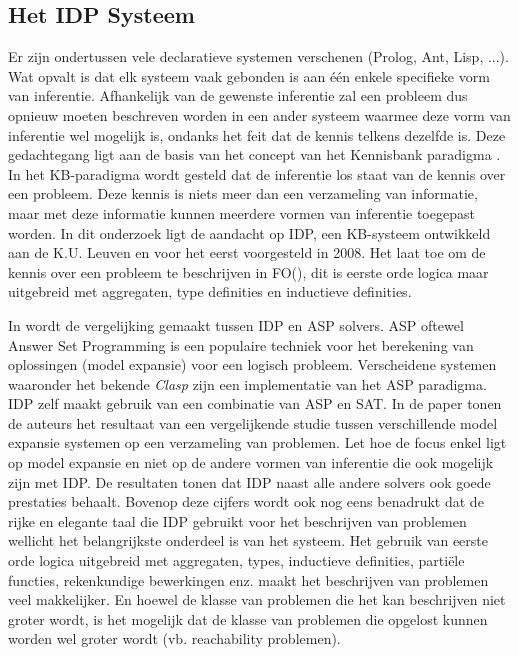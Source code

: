 \subsection{Het IDP Systeem}
Er zijn ondertussen vele declaratieve systemen verschenen (Prolog, Ant, Lisp, ...). Wat opvalt is dat elk systeem vaak gebonden is aan \'{e}\'{e}n enkele specifieke vorm van inferentie. Afhankelijk van de gewenste inferentie zal een probleem dus opnieuw moeten beschreven worden in een ander systeem waarmee deze vorm van inferentie wel mogelijk is, ondanks het feit dat de kennis telkens dezelfde is. Deze gedachtegang ligt aan de basis van het concept van het Kennisbank paradigma \citep{denecker2008building}. In het KB-paradigma wordt gesteld dat de inferentie los staat van de kennis over een probleem. Deze kennis is niets meer dan een verzameling van informatie, maar met deze informatie kunnen meerdere vormen van inferentie toegepast worden. In dit onderzoek ligt de aandacht op IDP, een KB-systeem ontwikkeld aan de K.U. Leuven en voor het eerst voorgesteld in 2008. Het laat toe om de kennis over een probleem te beschrijven in FO(\textperiodcentered), dit is eerste orde logica maar uitgebreid met aggregaten, type definities en inductieve definities. 

In \citep{wittocx2008idp} wordt de vergelijking gemaakt tussen IDP en ASP solvers. ASP oftewel Answer Set Programming is een populaire techniek voor het berekening van oplossingen (model expansie) voor een logisch probleem. Verscheidene systemen waaronder het bekende \textit{Clasp} zijn een implementatie van het ASP paradigma. IDP zelf maakt gebruik van een combinatie van ASP en SAT. In de paper tonen de auteurs het resultaat van een vergelijkende studie tussen verschillende model expansie systemen op een verzameling van problemen. Let hoe de focus enkel ligt op model expansie en niet op de andere vormen van inferentie die ook mogelijk zijn met IDP. De resultaten tonen dat IDP naast alle andere solvers ook goede prestaties behaalt. Bovenop deze cijfers wordt ook nog eens benadrukt dat de rijke en elegante taal die IDP gebruikt voor het beschrijven van problemen wellicht het belangrijkste onderdeel is van het systeem. Het gebruik van eerste orde logica uitgebreid met aggregaten, types, inductieve definities, parti\"{e}le functies, rekenkundige bewerkingen enz. maakt het beschrijven van problemen veel makkelijker. En hoewel de klasse van problemen die het kan beschrijven niet groter wordt, is het mogelijk dat de klasse van problemen die opgelost kunnen worden wel groter wordt (vb. reachability problemen).

